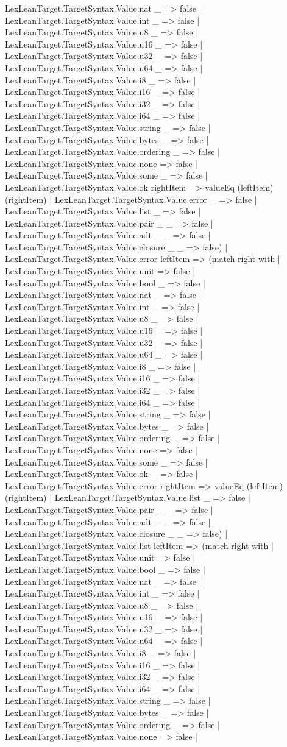 \documentclass[11pt]{article}
\begin{document}
LexLeanTarget.TargetSyntax.Value.nat \_ => false | LexLeanTarget.TargetSyntax.Value.int \_ => false | LexLeanTarget.TargetSyntax.Value.u8 \_ => false | LexLeanTarget.TargetSyntax.Value.u16 \_ => false | LexLeanTarget.TargetSyntax.Value.u32 \_ => false | LexLeanTarget.TargetSyntax.Value.u64 \_ => false | LexLeanTarget.TargetSyntax.Value.i8 \_ => false | LexLeanTarget.TargetSyntax.Value.i16 \_ => false | LexLeanTarget.TargetSyntax.Value.i32 \_ => false | LexLeanTarget.TargetSyntax.Value.i64 \_ => false | LexLeanTarget.TargetSyntax.Value.string \_ => false | LexLeanTarget.TargetSyntax.Value.bytes \_ => false | LexLeanTarget.TargetSyntax.Value.ordering \_ => false | LexLeanTarget.TargetSyntax.Value.none => false | LexLeanTarget.TargetSyntax.Value.some \_ => false | LexLeanTarget.TargetSyntax.Value.ok rightItem => valueEq (leftItem) (rightItem) | LexLeanTarget.TargetSyntax.Value.error \_ => false | LexLeanTarget.TargetSyntax.Value.list \_ => false | LexLeanTarget.TargetSyntax.Value.pair \_ \_ => false | LexLeanTarget.TargetSyntax.Value.adt \_ \_ => false | LexLeanTarget.TargetSyntax.Value.closure \_ \_ => false) | LexLeanTarget.TargetSyntax.Value.error leftItem => (match right with | LexLeanTarget.TargetSyntax.Value.unit => false | LexLeanTarget.TargetSyntax.Value.bool \_ => false | LexLeanTarget.TargetSyntax.Value.nat \_ => false | LexLeanTarget.TargetSyntax.Value.int \_ => false | LexLeanTarget.TargetSyntax.Value.u8 \_ => false | LexLeanTarget.TargetSyntax.Value.u16 \_ => false | LexLeanTarget.TargetSyntax.Value.u32 \_ => false | LexLeanTarget.TargetSyntax.Value.u64 \_ => false | LexLeanTarget.TargetSyntax.Value.i8 \_ => false | LexLeanTarget.TargetSyntax.Value.i16 \_ => false | LexLeanTarget.TargetSyntax.Value.i32 \_ => false | LexLeanTarget.TargetSyntax.Value.i64 \_ => false | LexLeanTarget.TargetSyntax.Value.string \_ => false | LexLeanTarget.TargetSyntax.Value.bytes \_ => false | LexLeanTarget.TargetSyntax.Value.ordering \_ => false | LexLeanTarget.TargetSyntax.Value.none => false | LexLeanTarget.TargetSyntax.Value.some \_ => false | LexLeanTarget.TargetSyntax.Value.ok \_ => false | LexLeanTarget.TargetSyntax.Value.error rightItem => valueEq (leftItem) (rightItem) | LexLeanTarget.TargetSyntax.Value.list \_ => false | LexLeanTarget.TargetSyntax.Value.pair \_ \_ => false | LexLeanTarget.TargetSyntax.Value.adt \_ \_ => false | LexLeanTarget.TargetSyntax.Value.closure \_ \_ => false) | LexLeanTarget.TargetSyntax.Value.list leftItem => (match right with | LexLeanTarget.TargetSyntax.Value.unit => false | LexLeanTarget.TargetSyntax.Value.bool \_ => false | LexLeanTarget.TargetSyntax.Value.nat \_ => false | LexLeanTarget.TargetSyntax.Value.int \_ => false | LexLeanTarget.TargetSyntax.Value.u8 \_ => false | LexLeanTarget.TargetSyntax.Value.u16 \_ => false | LexLeanTarget.TargetSyntax.Value.u32 \_ => false | LexLeanTarget.TargetSyntax.Value.u64 \_ => false | LexLeanTarget.TargetSyntax.Value.i8 \_ => false | LexLeanTarget.TargetSyntax.Value.i16 \_ => false | LexLeanTarget.TargetSyntax.Value.i32 \_ => false | LexLeanTarget.TargetSyntax.Value.i64 \_ => false | LexLeanTarget.TargetSyntax.Value.string \_ => false | LexLeanTarget.TargetSyntax.Value.bytes \_ => false | LexLeanTarget.TargetSyntax.Value.ordering \_ => false | LexLeanTarget.TargetSyntax.Value.none => false | 
\end{document}
